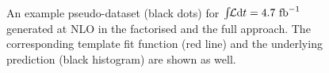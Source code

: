%
\begin{figure}[tbp!]
\centering
{}
\\
\caption[Quantitative effects of scale variations at \genlevel]{
%
An example pseudo-dataset (black dots) for $\int\!\!{\mathcal L}\mathrm{d}t=4.7~\mathrm{fb}^{-1}$ generated at \gls{NLO} in  the factorised and  the full approach. The corresponding template fit function (red line) and the underlying prediction (black histogram) are shown as well.
}
\end{figure}
